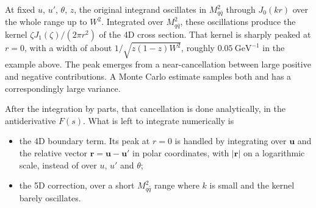 \documentclass[11pt,a4paper]{article}
\newcommand{\Mqq}{M_{q\bar q}^2}
\begin{document}
At fixed $u$, $u'$, $\theta$, $z$, the original integrand oscillates in $\Mqq$
through $J_0(kr)$ over the whole range up to $W^2$. Integrated over $\Mqq$,
these oscillations produce the kernel $\zeta J_1(\zeta)/(2\pi r^2)$ of the 4D
cross section. That kernel is sharply peaked at $r = 0$, with a width of about
$1/\sqrt{z(1-z)W^2}$, roughly $0.05\ \text{GeV}^{-1}$ in the example above. The
peak emerges from a near-cancellation between large positive and negative
contributions. A Monte Carlo estimate samples both and has a correspondingly
large variance.

After the integration by parts, that cancellation is done analytically, in the
antiderivative $F(s)$. What is left to integrate numerically is
\begin{itemize}
  \item the 4D boundary term. Its peak at $r = 0$ is handled by integrating over
        $\mathbf{u}$ and the relative vector $\mathbf{r} = \mathbf{u} -
        \mathbf{u}'$ in polar coordinates, with $|\mathbf{r}|$ on a logarithmic
        scale, instead of over $u$, $u'$ and $\theta$;
  \item the 5D correction, over a short $\Mqq$ range where $k$ is small and the
        kernel barely oscillates.
\end{itemize}
\end{document}
